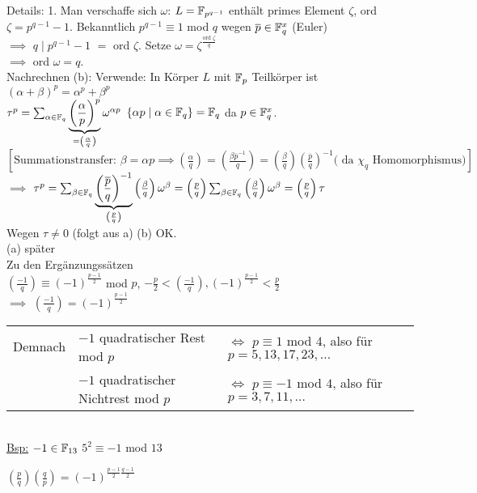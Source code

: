\documentclass[a4paper,twoside,DIV15,BCOR12mm]{scrbook}
\begin{document}
\begin{beweis}
Details: 1. Man verschaffe sich $\omega$: $L = \mathbb{F}_{p^{q-1}}$ enthält primes Element $\zeta$, ord $\zeta=p^{q-1}-1$. Bekanntlich $p^{q-1} \equiv 1$ mod $q$ wegen $\overline p \in \mathbb{F}_q^x$ (Euler) \\
$\implies$ $q \mid p^{q-1}-1$ $=$ ord $\zeta$. Setze $\omega=\zeta^\frac{\mbox{ord }\zeta}{q}$ \\
$\implies$ ord $\omega=q$. \\
Nachrechnen (b): Verwende: In Körper $L$ mit $\mathbb{F}_p$ Teilkörper ist $(\alpha + \beta)^p=\alpha^p + \beta^p$ \\
$\tau^p=\sum_{\alpha \in \mathbb{F}_q}\underbrace{\left(\frac{\alpha}{p}\right)^p}_{=\left(\frac{\alpha}{q}\right)}\omega^{\alpha p}$ \quad$\left\{\alpha p \mid \alpha \in \mathbb{F}_q\right\} = \mathbb{F}_q$ da $p\in\mathbb{F}_q^x$.\\
$\left[\mbox{Summationstransfer: }\beta=\alpha p\implies\left(\frac{\alpha}{q}\right)=\left(\frac{\beta \overline p ^{-1}}{q}\right) = \left(\frac{\beta}{q}\right)\left(\frac{\overline p}{q}\right)^{-1}\mbox{( da $\chi_q$ Homomorphismus)}\right]$\\
$\implies$ $\tau^p=\sum_{\beta \in \mathbb{F}_q}\underbrace{\left(\frac{\overline p}{q}\right)^{-1}}_{\left(\frac{p}{q}\right)}\left(\frac{\beta}{q}\right)\omega^\beta = \left(\frac{p}{q}\right) \sum_{\beta \in \mathbb{F}_q} \left(\frac{\beta}{q}\right)\omega^\beta = \left(\frac{p}{q}\right)\tau$ \\
Wegen $\tau \neq 0$ (folgt aus a) (b) OK.\\
(a) später \\
Zu den Ergänzungssätzen\\
$\left(\frac{-1}{q}\right) \equiv (-1)^\frac{p-1}{2}$ mod $p$, $-\frac{p}{2} < \left(\frac{-1}{q}\right),(-1)^\frac{p-1}{2}<\frac{p}{2}$ \\
$\implies$ $\left(\frac{-1}{q}\right)=(-1)^\frac{p-1}{2}$\\
\begin{tabular}{lll}
Demnach & $-1$ quadratischer Rest mod $p$ & $\iff$ $p\equiv 1$ mod $4$, also für $p=5,13,17,23,\dotsc$ \\
        & $-1$ quadratischer Nichtrest mod $p$ &  $\iff$ $p\equiv -1$ mod $4$, also für $p=3,7,11,\dotsc$ \\
\end{tabular}\\
\underline{Bsp:} $-1\in\mathbb{F}_{13}$ $5^2 \equiv -1$ mod $13$
\end{beweis}

$\left(\frac{p}{q}\right)\left(\frac{q}{p}\right) =
(-1)^{\frac{p-1}{2} \frac{q-1}{2}}$
\end{document}
